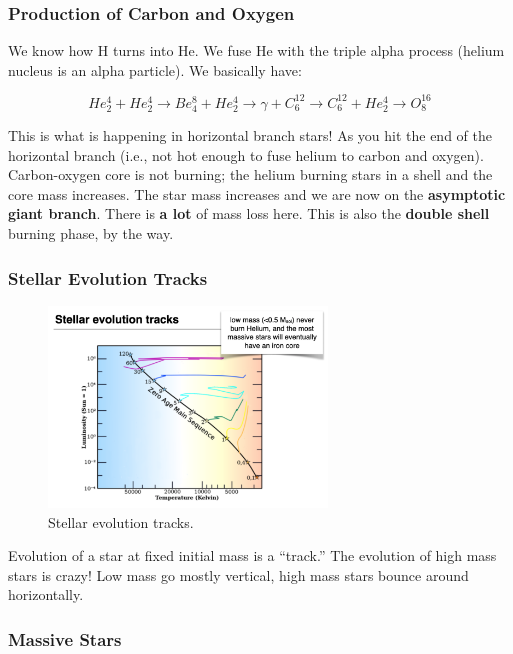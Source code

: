 \documentclass{article}
\begin{document}
\subsubsection{Production of Carbon and Oxygen}

We know how H turns into He. We fuse He with the triple alpha process (helium nucleus is an alpha particle). We basically have:

\begin{equation}
    He_2^4 + He_2^4  \rightarrow Be_4^8 + He_2^4 \rightarrow \gamma + C_6^{12} \rightarrow C_6^{12} + He_2^4 \rightarrow O_8^{16}
\end{equation}

This is what is happening in horizontal branch stars! As you hit the end of the horizontal branch (i.e., not hot enough to fuse helium to carbon and oxygen). Carbon-oxygen core is not burning; the helium burning stars in a shell and the core mass increases. The star mass increases and we are now on the \textbf{asymptotic giant branch}. There is \textbf{a lot} of mass loss here. This is also the \textbf{double shell} burning phase, by the way. 

\subsubsection{Stellar Evolution Tracks}

\begin{figure}
    \centering
    \includegraphics[width=0.66\textwidth]{figs/Screen Shot 2021-09-15 at 9.09.16 AM.png}
    \caption{Stellar evolution tracks.}
    \label{fig:Tracks}
\end{figure}

Evolution of a star at fixed initial mass is a ``track.'' The evolution of high mass stars is crazy! Low mass go mostly vertical, high mass stars bounce around horizontally. 
\subsubsection{Massive Stars}
\end{document}
